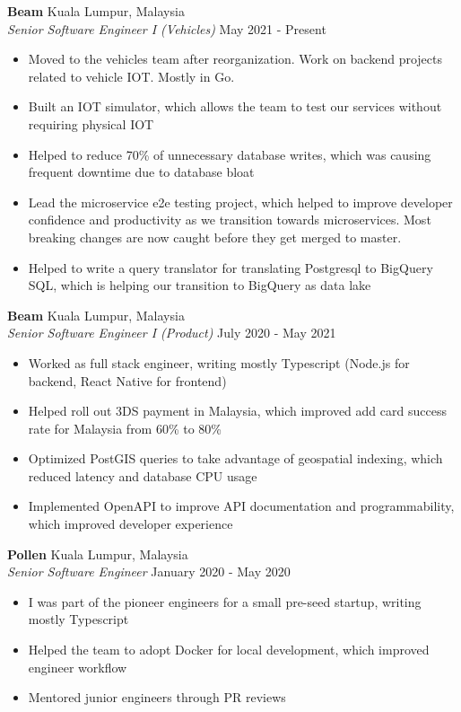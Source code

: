 \documentclass[a4paper]{article}
\begin{document}
\textbf{Beam} \hfill Kuala Lumpur, Malaysia\\
\textit{Senior Software Engineer I (Vehicles)} \hfill May 2021 - Present\\
\vspace{-1mm}
\begin{itemize} \itemsep 1pt
	\item Moved to the vehicles team after reorganization. Work on backend projects related to vehicle IOT. Mostly in Go.
	\item Built an IOT simulator, which allows the team to test our services without requiring physical IOT
	\item Helped to reduce 70\% of unnecessary database writes, which was causing frequent downtime due to database bloat
	\item Lead the microservice e2e testing project, which helped to improve developer confidence and productivity as we transition towards microservices. Most breaking changes are now caught before they get merged to master.
	\item Helped to write a query translator for translating Postgresql to BigQuery SQL, which is helping our transition to BigQuery as data lake
\end{itemize}
\textbf{Beam} \hfill Kuala Lumpur, Malaysia\\
\textit{Senior Software Engineer I (Product)} \hfill July 2020 - May 2021\\
\vspace{-1mm}
\begin{itemize} \itemsep 1pt
	\item Worked as full stack engineer, writing mostly Typescript (Node.js for backend, React Native for frontend)
	\item Helped roll out 3DS payment in Malaysia, which improved add card success rate for Malaysia from 60\% to 80\%
	\item Optimized PostGIS queries to take advantage of geospatial indexing, which reduced latency and database CPU usage
	\item Implemented OpenAPI to improve API documentation and programmability, which improved developer experience
\end{itemize}
\textbf{Pollen} \hfill Kuala Lumpur, Malaysia\\
\textit{Senior Software Engineer} \hfill January 2020 - May 2020\\
\vspace{-1mm}
\begin{itemize} \itemsep 1pt
	\item I was part of the pioneer engineers for a small pre-seed startup, writing mostly Typescript
	\item Helped the team to adopt Docker for local development, which improved engineer workflow
	\item Mentored junior engineers through PR reviews
\end{itemize}
\end{document}
